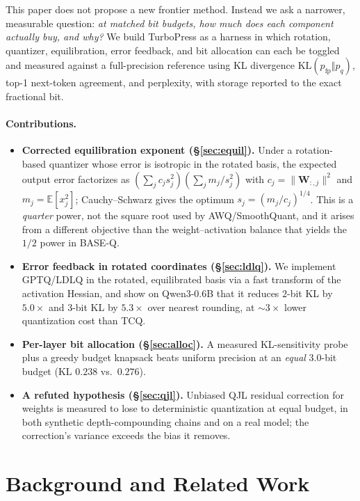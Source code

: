 \documentclass[11pt]{article}
\newcommand{\kl}{\mathrm{KL}}
\newcommand{\E}{\mathbb{E}}
\newcommand{\W}{\mathbf{W}}
\begin{document}
This paper does not propose a new frontier method. Instead we ask a narrower,
measurable question: \emph{at matched bit budgets, how much does each component
actually buy, and why?} We build TurboPress as a harness in which rotation,
quantizer, equilibration, error feedback, and bit allocation can each be toggled
and measured against a full-precision reference using KL divergence
$\kl(p_{\text{fp}}\Vert p_q)$, top-1 next-token agreement, and perplexity, with
storage reported to the exact fractional bit.

\paragraph{Contributions.}
\begin{itemize}\itemsep2pt
  \item \textbf{Corrected equilibration exponent (\S\ref{sec:equil}).} Under a
  rotation-based quantizer whose error is isotropic in the rotated basis, the
  expected output error factorizes as
  $\left(\sum_j c_j s_j^2\right)\!\left(\sum_j m_j/s_j^2\right)$ with
  $c_j=\lVert\W_{:,j}\rVert^2$ and $m_j=\E[x_j^2]$; Cauchy--Schwarz gives the
  optimum $s_j=(m_j/c_j)^{1/4}$. This is a \emph{quarter} power, not the square
  root used by AWQ/SmoothQuant, and it arises from a different objective than
  the weight--activation balance that yields the $1/2$ power in BASE-Q.
  \item \textbf{Error feedback in rotated coordinates (\S\ref{sec:ldlq}).} We
  implement GPTQ/LDLQ in the rotated, equilibrated basis via a fast transform of
  the activation Hessian, and show on Qwen3-0.6B that it reduces $2$-bit KL by
  $5.0\times$ and $3$-bit KL by $5.3\times$ over nearest rounding, at $\sim\!3\times$
  lower quantization cost than TCQ.
  \item \textbf{Per-layer bit allocation (\S\ref{sec:alloc}).} A measured
  KL-sensitivity probe plus a greedy budget knapsack beats uniform precision at
  an \emph{equal} $3.0$-bit budget ($\kl$ $0.238$ vs.\ $0.276$).
  \item \textbf{A refuted hypothesis (\S\ref{sec:qjl}).} Unbiased QJL residual
  correction for weights is measured to lose to deterministic quantization at
  equal budget, in both synthetic depth-compounding chains and on a real model;
  the correction's variance exceeds the bias it removes.
\end{itemize}

\section{Background and Related Work}
\end{document}
